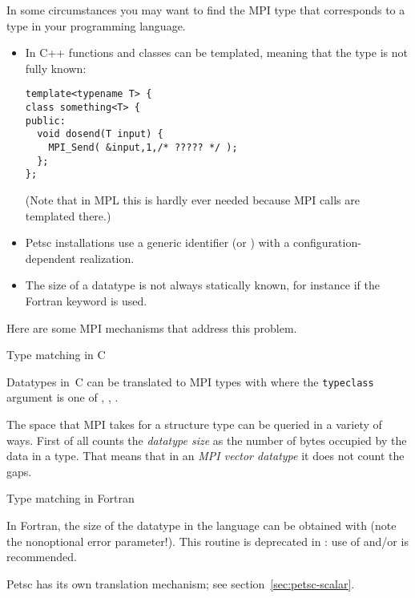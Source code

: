 In some circumstances you may want to find the MPI type
that corresponds to a type in your programming language.
\begin{itemize}
\item In C++ functions and classes can be templated,
  meaning that the type is not fully known:
\begin{lstlisting}
template<typename T> {
class something<T> {
public:
  void dosend(T input) {
    MPI_Send( &input,1,/* ????? */ );
  };
};
\end{lstlisting}
(Note that in \ac{MPL} this is hardly ever needed
because MPI calls are templated there.)
\item Petsc installations use a generic identifier 
  (or )
  with a configuration-dependent realization.
\item The size of a datatype is not always statically known, for instance if
the Fortran  keyword is used.
\end{itemize}

Here are some MPI mechanisms that address this problem.

 {Type matching in C}
\label{sec:mpi-type-match-c}

Datatypes in~C can be translated to MPI types with
%
%
where the \lstinline{typeclass} argument is one of
,
,
.


The space that MPI takes for a structure type can be queried in a
variety of ways. First of all  counts the
\emph{datatype size} as the 
number of bytes occupied by the data in a type. That means that in an
\emph{MPI vector datatype} it does not
count the gaps.
%

\begin{comment}
In C, the \indexmpidef{MPI_Datatype} type is defined through the pre-processor,
allowing you to write:
\cverbatimsnippet{datatypevar}
\end{comment}

 {Type matching in Fortran}
\label{sec:mpi-type-match-f}

In Fortran, the size of the datatype in the language can be obtained with
 (note the nonoptional error parameter!).
This routine is deprecated in : use of
 and/or  is recommended.


Petsc has its own translation mechanism; see section~\ref{sec:petsc-scalar}.


